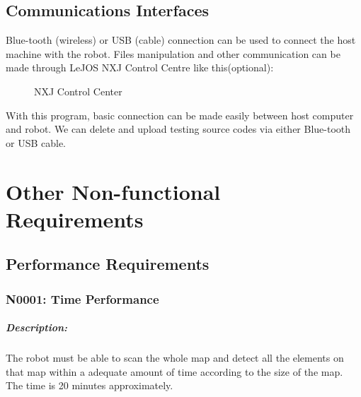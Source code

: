 \documentclass[11pt, a4paper]{report}
\begin{document}
\section{Communications Interfaces}
Blue-tooth (wireless) or USB (cable) connection can be used to connect the host machine with the robot.  Files manipulation and other communication can be made through LeJOS NXJ Control Centre like this(optional): 

\begin{figure}[ht]
\centering
\setlength\fboxsep{2pt}
\setlength\fboxrule{0.2pt}
\caption{NXJ Control Center}
\label{sec:NXJCC}
\label{fig:NXJCC}
\end{figure}
With this program, basic connection can be made easily between host computer and robot. 
We can delete and upload testing source codes via either Blue-tooth or USB cable.
\pagebreak



\chapter{Other Non-functional Requirements}


\section{Performance Requirements}

\subsection{N0001: Time Performance}
\paragraph{Description:}
The robot must be able to scan the whole map and detect all the elements on that map within a adequate amount of time according to the size of the map. The time is 20 minutes approximately. 
\end{document}
